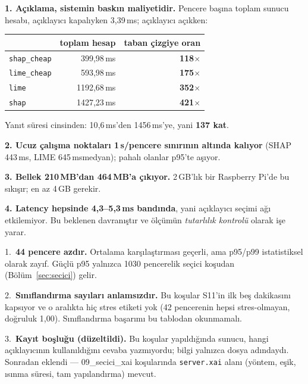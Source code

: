 \documentclass[11pt,a4paper]{report}
\newcommand{\ms}{\,ms}
\newcommand{\kod}[1]{\texttt{\small #1}}
\begin{document}
\begin{bulgu}
\textbf{1. Açıklama, sistemin baskın maliyetidir.} Pencere başına toplam sunucu
hesabı, açıklayıcı kapalıyken 3{,}39\ms; açıklayıcı açıkken:
\begin{center}\small
\begin{tabular}{@{}lrr@{}}
\toprule
& toplam hesap & \textbf{taban çizgiye oran} \\
\midrule
\kod{shap\_cheap} & 399{,}98\ms & \textbf{118$\times$} \\
\kod{lime\_cheap} & 593{,}98\ms & \textbf{175$\times$} \\
\kod{lime}        & 1192{,}68\ms & \textbf{352$\times$} \\
\kod{shap}        & 1427{,}23\ms & \textbf{421$\times$} \\
\bottomrule
\end{tabular}
\end{center}
Yanıt süresi cinsinden: 10{,}6\ms'den 1456\ms'ye, yani \textbf{137 kat}.

\textbf{2. Ucuz çalışma noktaları 1\,s/pencere sınırının altında kalıyor}
(SHAP 443\ms, LIME 645\ms medyan); pahalı olanlar p95'te aşıyor.

\textbf{3. Bellek 210\,MB'dan 464\,MB'a çıkıyor.} 2\,GB'lık bir Raspberry Pi'de
bu sıkışır; en az 4\,GB gerekir.

\textbf{4. Latency hepsinde 4{,}3--5{,}3\ms{} bandında}, yani açıklayıcı seçimi
ağı etkilemiyor. Bu beklenen davranıştır ve ölçümün \emph{tutarlılık kontrolü}
olarak işe yarar.
\end{bulgu}

\begin{uyari}
1.~\textbf{44 pencere azdır.} Ortalama karşılaştırması geçerli, ama p95/p99
istatistiksel olarak zayıf. Güçlü p95 yalnızca 1030 pencerelik seçici koşudan
(Bölüm~\ref{sec:secici}) gelir.

2.~\textbf{Sınıflandırma sayıları anlamsızdır.} Bu koşular S11'in ilk beş
dakikasını kapsıyor ve o aralıkta hiç stres etiketi yok (42 pencerenin hepsi
stres-olmayan, doğruluk 1{,}00). Sınıflandırma başarımı bu tablodan okunmamalı.

3.~\textbf{Kayıt boşluğu (düzeltildi).} Bu koşular yapıldığında sunucu, hangi
açıklayıcının kullanıldığını cevaba yazmıyordu; bilgi yalnızca dosya adındaydı.
Sonradan eklendi --- 09\_secici\_xai koşularında \kod{server.xai} alanı
(yöntem, eşik, ısınma süresi, tam yapılandırma) mevcut.
\end{uyari}
\end{document}
